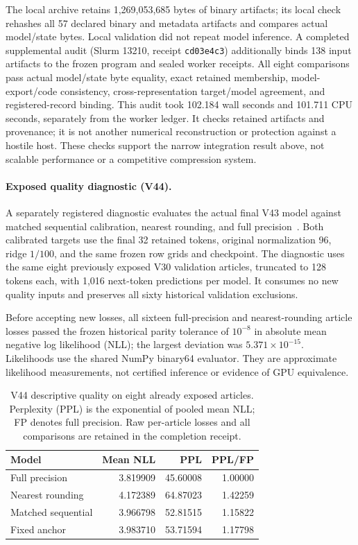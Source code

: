 \documentclass[10pt,twocolumn,letterpaper]{article}
\begin{document}
The local archive retains 1,269,053,685 bytes of binary artifacts; its local
check rehashes all 57 declared binary and metadata artifacts and compares actual
model/state bytes. Local validation did not repeat model inference. A completed
supplemental audit (Slurm 13210, receipt \texttt{cd03e4c3}) additionally binds 138
input artifacts to the frozen program and sealed worker receipts. All eight
comparisons pass actual model/state byte equality, exact retained membership,
model-export/code consistency, cross-representation target/model agreement, and
registered-record binding. This audit took 102.184 wall seconds and 101.711 CPU
seconds, separately from the worker ledger. It checks retained artifacts and
provenance; it is not another numerical reconstruction or protection against a
hostile host. These checks support the narrow integration result above, not
scalable performance or a competitive compression system.

\paragraph{Exposed quality diagnostic (V44).}
A separately registered diagnostic evaluates the actual final V43 model against
matched sequential calibration, nearest rounding, and full precision~\cite{v44}.
Both calibrated targets use the final 32 retained tokens, original normalization
96, ridge $1/100$, and the same frozen row grids and checkpoint. The diagnostic
uses the same eight previously exposed V30 validation articles, truncated to 128
tokens each, with 1,016 next-token predictions per model. It consumes no new
quality inputs and preserves all sixty historical validation exclusions.

Before accepting new losses, all sixteen full-precision and nearest-rounding
article losses passed the frozen historical parity tolerance of $10^{-8}$ in
absolute mean negative log likelihood (NLL); the largest deviation was
$5.371\times10^{-15}$. Likelihoods use the shared NumPy binary64 evaluator. They
are approximate likelihood measurements, not certified inference or evidence of
GPU equivalence.

\begin{table}[t]
\centering
\small
\setlength{\tabcolsep}{3pt}
\begin{tabular}{lrrr}
\toprule
Model & Mean NLL & PPL & PPL/FP \\
\midrule
Full precision & 3.819909 & 45.60008 & 1.00000 \\
Nearest rounding & 4.172389 & 64.87023 & 1.42259 \\
Matched sequential & 3.966798 & 52.81515 & 1.15822 \\
Fixed anchor & 3.983710 & 53.71594 & 1.17798 \\
\bottomrule
\end{tabular}
\caption{V44 descriptive quality on eight already exposed articles. Perplexity
(PPL) is the exponential of pooled mean NLL; FP denotes full precision. Raw
per-article losses and all comparisons are retained in the completion receipt.}
\label{tab:v44}
\end{table}
\end{document}
